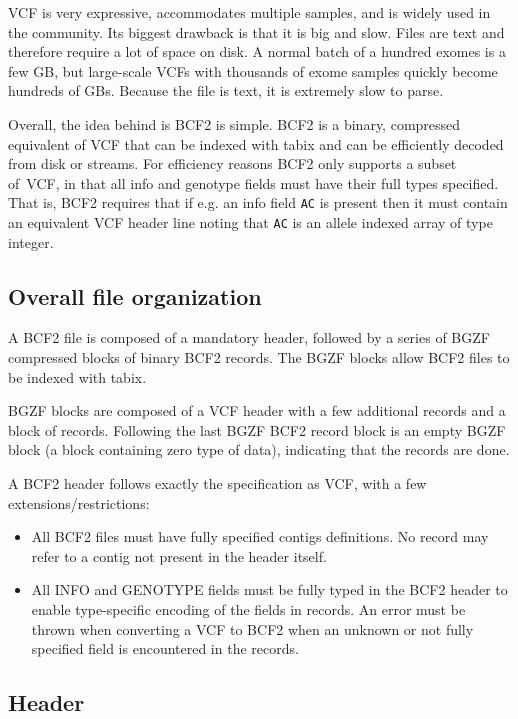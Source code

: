 \documentclass[8pt]{article}
\begin{document}
VCF is very expressive, accommodates multiple samples, and is widely used
in the community.  Its biggest drawback is that it is big and slow.
Files are text and therefore require a lot of space on disk.  A normal batch
of a hundred exomes is a few GB, but large-scale VCFs with thousands of exome
samples quickly become hundreds of GBs.  Because the file is text, it is
extremely slow to parse.

Overall, the idea behind is BCF2 is simple.  BCF2 is a binary, compressed
equivalent of VCF that can be indexed with tabix and can be efficiently decoded
from disk or streams.  For efficiency reasons BCF2 only supports a subset
of~VCF, in that all info and genotype fields must have their full types
specified.  That is, BCF2 requires that if e.g. an info field {\tt AC} is
present then it must contain an equivalent VCF header line noting that {\tt AC}
is an allele indexed array of type integer.

\subsection{Overall file organization}

A BCF2 file is composed of a mandatory header, followed by a series of BGZF
compressed blocks of binary BCF2 records.  The BGZF blocks allow BCF2 files
to be indexed with tabix.

BGZF blocks are composed of a VCF header with a few additional records and a
block of records.  Following the last BGZF BCF2 record block is an empty
BGZF block (a block containing zero type of data), indicating that the
records are done.

A BCF2 header follows exactly the specification as VCF, with a few
extensions/restrictions:
\begin{itemize}
\item All BCF2 files must have fully specified contigs definitions.
No record may refer to a contig not present in the header itself.

\item All INFO and GENOTYPE fields must be fully typed in the BCF2 header to
enable type-specific encoding of the fields in records.  An error must be
thrown when converting a VCF to BCF2 when an unknown or not fully specified
field is encountered in the records.
\end{itemize}

\subsection{Header}
\end{document}
